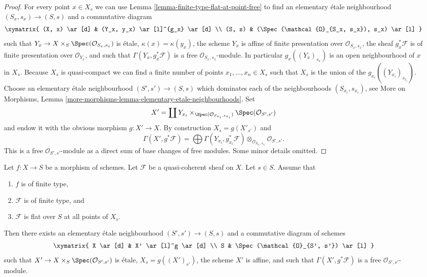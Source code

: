 \begin{proof}
For every point $x \in X_s$ we can use
Lemma \ref{lemma-finite-type-flat-at-point-free}
to find an elementary \'etale neighbourhood $(S_x , s_x) \to (S, s)$
and a commutative diagram
$$
\xymatrix{
(X, x) \ar[d] & (Y_x, y_x) \ar[l]^{g_x} \ar[d] \\
(S, s) & (\Spec(\mathcal{O}_{S_x, s_x}), s_x) \ar[l]
}
$$
such that $Y_x \to X \times_S \Spec(\mathcal{O}_{S_x, s_x})$
is \'etale, $\kappa(x) = \kappa(y_x)$, the scheme $Y_x$ is affine
of finite presentation over $\mathcal{O}_{S_x, s_x}$, the sheaf
$g_x^*\mathcal{F}$ is of finite presentation over $\mathcal{O}_{Y_x}$, and
such that $\Gamma(Y_x, g_x^*\mathcal{F})$ is a free
$\mathcal{O}_{S_x, s_x}$-module. In particular
$g_x((Y_x)_{s_x})$ is an open neighbourhood of $x$ in $X_s$.
Because $X_s$ is quasi-compact we can find a finite number of points
$x_1, \ldots, x_n \in X_s$ such that $X_s$ is the union of
the $g_{x_i}((Y_{x_i})_{s_{x_i}})$. Choose an elementary \'etale neighbourhood
$(S' , s') \to (S, s)$ which dominates each of the neighbourhoods
$(S_{x_i}, s_{x_i})$, see
More on Morphisms,
Lemma \ref{more-morphisms-lemma-elementary-etale-neighbourhoods}.
Set
$$
X' = \coprod Y_{x_i} \times_{\Spec(\mathcal{O}_{S_{x_i}, s_{x_i}})}
\Spec(\mathcal{O}_{S', s'})
$$
and endow it with the obvious morphism $g : X' \to X$.
By construction $X_s = g(X'_{s'})$ and
$$
\Gamma(X', g^*\mathcal{F})
=
\bigoplus \Gamma(Y_{x_i}, g_{x_i}^*\mathcal{F})
\otimes_{\mathcal{O}_{S_{x_i}, s_{x_i}}}
\mathcal{O}_{S', s'}.
$$
This is a free $\mathcal{O}_{S', s'}$-module as a direct sum
of base changes of free modules. Some minor details omitted.
\end{proof}

\begin{lemma}
\label{lemma-finite-type-flat-along-fibre-free-variant}
Let $f : X \to S$ be a morphism of schemes.
Let $\mathcal{F}$ be a quasi-coherent sheaf on $X$.
Let $s \in S$.
Assume that
\begin{enumerate}
\item $f$ is of finite type,
\item $\mathcal{F}$ is of finite type, and
\item $\mathcal{F}$ is flat over $S$ at all points of $X_s$.
\end{enumerate}
Then there exists an elementary \'etale neighbourhood $(S', s') \to (S, s)$
and a commutative diagram of schemes
$$
\xymatrix{
X \ar[d] & X' \ar[l]^g \ar[d] \\
S & \Spec(\mathcal{O}_{S', s'}) \ar[l]
}
$$
such that $X' \to X \times_S \Spec(\mathcal{O}_{S', s'})$
is \'etale, $X_s = g((X')_{s'})$, the scheme $X'$ is affine,
and such that $\Gamma(X', g^*\mathcal{F})$ is a free
$\mathcal{O}_{S', s'}$-module.
\end{lemma}

